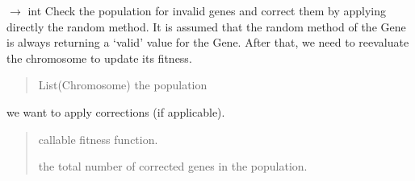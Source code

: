 \documentclass[letterpaper,10pt,english]{sphinxmanual}
\begin{document}

\begin{fulllineitems}
\label{\detokenize{pygenalgo.engines:pygenalgo.engines.auxiliary.apply_corrections}}
\pysigstartsignatures
\pysiglinewithargsret
{}
{\sphinxparamcomma {}}
{{ $\rightarrow$ int}}
\pysigstopsignatures
\sphinxAtStartPar
Check the population  for invalid genes and correct them by applying directly
the random method. It is assumed that the random method of the Gene is always
returning a ‘valid’ value for the Gene. After that, we need to reevaluate the
chromosome to update its fitness.
\begin{quote}\begin{description}
\sphinxAtStartPar
{} \textendash{} List(Chromosome) the population

\end{description}\end{quote}

\sphinxAtStartPar
we want to apply corrections (if applicable).
\begin{quote}\begin{description}
\sphinxAtStartPar
{} \textendash{} callable fitness function.

\sphinxAtStartPar
the total number of corrected genes in the population.

\end{description}\end{quote}

\end{fulllineitems}

\end{document}
